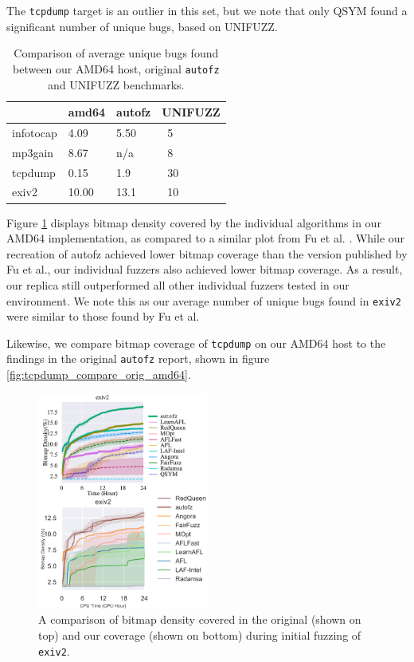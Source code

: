 The \texttt{tcpdump} target is an outlier in this set, but we note that only QSYM found 
a significant number of unique bugs, based on UNIFUZZ. 

\begin{table}[ht!]
    \begin{tabular}{llll}
        \toprule
         & amd64 & autofz\cite{fu_autofz_2023} & UNIFUZZ\cite{li_unifuzz_2021} \\
        \midrule
        infotocap & 4.09 & 5.50 & ~5 \\
        mp3gain & 8.67 & n/a & ~8 \\
        tcpdump & 0.15 & 1.9 &  ~30 \\
        exiv2 & 10.00 & 13.1 & ~10 \\
        \bottomrule
    \end{tabular}
    \caption{Comparison of average unique bugs found between our AMD64 host, original
    \texttt{autofz} and UNIFUZZ benchmarks.}
    \label{amd64-benchmark-comparison}
\end{table}

Figure \ref{fig:exiv2_compare_orig_amd64} displays bitmap density covered by the individual 
algorithms in our AMD64 implementation, as compared to a similar plot from Fu et al.
\cite{fu_autofz_2023}. While our recreation of autofz achieved lower bitmap coverage than 
the version published by Fu et al., our individual fuzzers also achieved lower bitmap 
coverage. As a result, our replica still outperformed all other individual fuzzers tested 
in our environment. We note this as our average number of unique bugs found in \texttt{exiv2} 
were similar to those found by Fu et al. 

Likewise, we compare bitmap coverage of \texttt{tcpdump} on our AMD64 host to the findings 
in the original \texttt{autofz} report\cite{fu_autofz_2023}, shown in figure 
\ref{fig:tcpdump_compare_orig_amd64}.

\begin{figure}[ht!]
    \includegraphics[width=0.5\textwidth]{figs/exiv2_compare_orig_amd64.png}
    \centering
    \caption{A comparison of bitmap density covered in the original\cite{fu_autofz_2023} (shown 
    on top) and our coverage (shown on bottom) during initial fuzzing of \texttt{exiv2}.}
    \label{fig:exiv2_compare_orig_amd64}
\end{figure}

